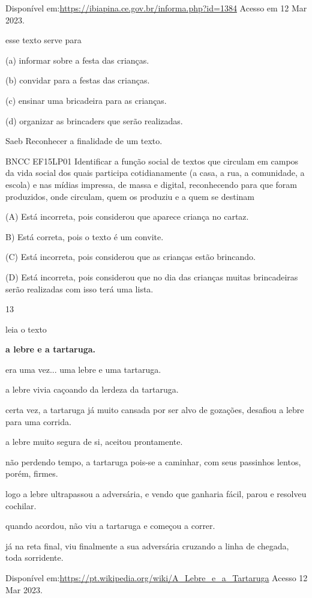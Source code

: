{{{{{{Disponível em:\url{https://ibiapina.ce.gov.br/informa.php?id=1384}
Acesso em 12 Mar 2023.

esse texto serve para

(a) informar sobre a festa das crianças.

(b) convidar para a festas das crianças.

(c) ensinar uma bricadeira para as crianças.

(d) organizar as brincaders que serão realizadas.

Saeb Reconhecer a finalidade de um texto.

BNCC EF15LP01 Identificar a função social de textos que circulam em
campos da vida social dos quais participa cotidianamente (a casa, a rua,
a comunidade, a escola) e nas mídias impressa, de massa e digital,
reconhecendo para que foram produzidos, onde circulam, quem os produziu
e a quem se destinam

(A) Está incorreta, pois considerou que aparece criança no cartaz.

B) Está correta, pois o texto é um convite.

(C) Está incorreta, pois considerou que as crianças estão brincando.

(D) Está incorreta, pois considerou que no dia das crianças muitas
brincadeiras serão realizadas com isso terá uma lista.

\num{13}

leia o texto

\textbf{a lebre e a tartaruga.}

era uma vez... uma lebre e uma tartaruga.

a lebre vivia caçoando da lerdeza da tartaruga.

certa vez, a tartaruga já muito cansada por ser alvo de gozações,
desafiou a lebre para uma corrida.

a lebre muito segura de si, aceitou prontamente.

não perdendo tempo, a tartaruga pois-se a caminhar, com seus passinhos
lentos, porém, firmes.

logo a lebre ultrapassou a adversária, e vendo que ganharia fácil, parou
e resolveu cochilar.

quando acordou, não viu a tartaruga e começou a correr.

já na reta final, viu finalmente a sua adversária cruzando a linha de
chegada, toda sorridente.

Disponível em:\url{https://pt.wikipedia.org/wiki/A_Lebre_e_a_Tartaruga}
Acesso 12 Mar 2023.

}}}}}}
